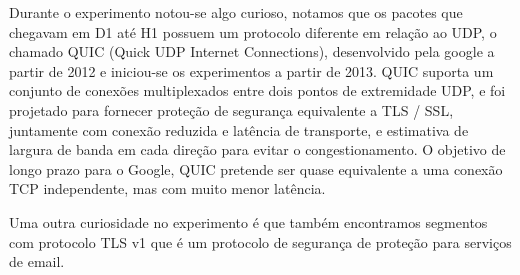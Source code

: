 Durante o experimento notou-se algo curioso, notamos que os pacotes que chegavam
em D1 até H1 possuem um protocolo diferente em relação ao UDP, o chamado QUIC
(Quick UDP Internet Connections), desenvolvido pela google a partir de 2012 e
iniciou-se os experimentos a partir de 2013. QUIC suporta um conjunto de conexões
multiplexados entre dois pontos de extremidade UDP, e foi projetado para fornecer
proteção de segurança equivalente a TLS / SSL, juntamente com conexão reduzida e
latência de transporte, e estimativa de largura de banda em cada direção para
evitar o congestionamento. O objetivo de longo prazo para o Google, QUIC
pretende ser quase equivalente a uma conexão TCP independente, mas com muito
menor latência.

Uma outra curiosidade no experimento é que também encontramos segmentos com
protocolo TLS v1 que é um protocolo de segurança de proteção para serviços de email.
